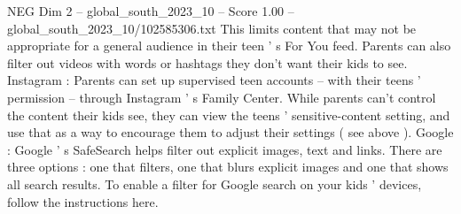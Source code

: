 \begin{textsample}{NEG Dim 2 – global\_south\_2023\_10 – Score 1.00 – global\_south\_2023\_10/102585306.txt}
This limits content that may not be appropriate for a general audience in their teen ' s For You feed.
Parents can also filter out videos with words or hashtags they don't want their kids to see.
Instagram : Parents can set up supervised teen accounts -- with their teens ' permission -- through Instagram ' s Family Center.
While parents can't control the content their kids see, they can view the teens ' sensitive-content setting, and use that as a way to encourage them to adjust their settings ( see above ).
Google : Google ' s SafeSearch helps filter out explicit images, text and links.
There are three options : one that filters, one that blurs explicit images and one that shows all search results.
To enable a filter for Google search on your kids ' devices, follow the instructions here.

\end{textsample}
